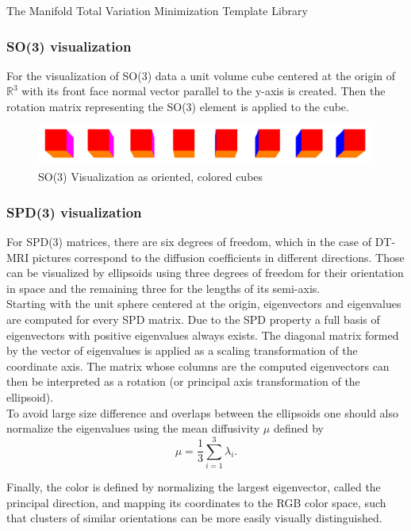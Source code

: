 \begin{chapter}{The Manifold Total Variation Minimization Template Library}
\subsubsection{SO(3) visualization} %
\label{ssub:SO(3) Visualization}
For the visualization of SO(3) data a unit volume cube centered at the origin of $\mathbb{R}^3$ with its front face normal vector parallel to the y-axis is created.
Then the rotation matrix representing the SO(3) element is applied to the cube.

\begin{figure}[h!]
        \centering
	    \includegraphics[width=0.8\linewidth]{./figures/library/cubes.pdf}
	    \caption[SO(3) cube visualization]{SO(3) Visualization as oriented, colored cubes}
	\label{fig:cube_visualization}
\end{figure}

\subsubsection{SPD(3) visualization} %
\label{ssub:SPD(3) Visualization}
For SPD(3) matrices, there are six degrees of freedom, which in the case of DT-MRI pictures correspond to the diffusion coefficients in different directions.
Those can be visualized by ellipsoids using three degrees of freedom for their orientation in space and the remaining three for the lengths of its semi-axis.\\
Starting with the unit sphere centered at the origin, eigenvectors and eigenvalues are computed for every SPD matrix. Due to the SPD property a full basis of eigenvectors
with positive eigenvalues always exists. The diagonal matrix formed by the vector of eigenvalues is applied as a scaling transformation of the coordinate axis. The matrix
whose columns are the computed eigenvectors can then be interpreted as a rotation (or principal axis transformation of the ellipsoid).\\
To avoid large size difference and overlaps between the ellipsoids one should also normalize the eigenvalues using the mean diffusivity $\mu$ defined by
\begin{equation}
    \mu = \frac{1}{3} \sum_{i=1}^{3}\lambda_i.
\end{equation}

Finally, the color is defined by normalizing the largest eigenvector, called the principal direction, and mapping its coordinates to the RGB color space, such that clusters of
similar orientations can be more easily visually distinguished.


\end{chapter}
